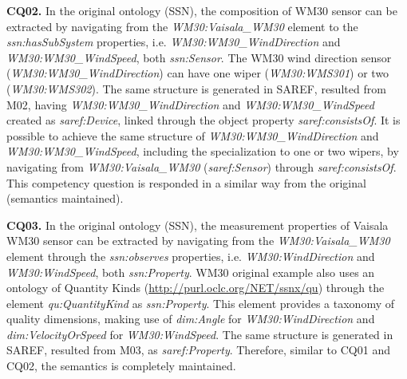 \documentclass{sig-alternate-05-2015}
\begin{document}
\noindent
\textbf{CQ02.} In the original ontology (SSN), the composition of WM30 sensor can be extracted by navigating from the \textit{WM30:\-Vaisala\-\_WM30} element to the \textit{ssn:\-hasSubSystem} properties, i.e. \textit{WM30:\-WM30\-\_Wind\-Direction} and \textit{WM30:\-WM30\-\_WindSpeed}, both \textit{ssn:\-Sensor}. The WM30 wind direction sensor (\textit{WM30:\-WM30\-\_Wind\-Direction}) can have one wiper (\textit{WM30:\-WMS301}) or two (\textit{WM30:\-WMS302}). The same structure is generated in SAREF, resulted from M02, having \textit{WM30:\-WM30\-\_Wind\-Direction} and \textit{WM30:\-WM30\-\_WindSpeed} created as \textit{saref:\-Device}, linked through the object property \textit{saref:\-consistsOf}. It is possible to achieve the same structure of \textit{WM30:\-WM30\-\_Wind\-Direction} and \textit{WM30:\-WM30\-\_WindSpeed}, including the specialization to one or two wipers, by navigating from \textit{WM30:\-Vaisala\-\_WM30} (\textit{saref:\-Sensor}) through \textit{saref:\-consistsOf}. This competency question is responded in a similar way from the original (semantics maintained).

\noindent
\textbf{CQ03.} In the original ontology (SSN), the measurement properties of Vaisala WM30 sensor can be extracted by navigating from the \textit{WM30:\-Vaisala\-\_WM30} element through the \textit{ssn:\-observes} properties, i.e. \textit{WM30:\-WindDirection} and \textit{WM30:\-WindSpeed}, both \textit{ssn:\-Property}. WM30 original example also uses an ontology of Quantity Kinds (\url{http://purl.oclc.org/NET/ssnx/qu}) through the element \textit{qu:QuantityKind} as \textit{ssn:\-Property}. This element provides a taxonomy of quality dimensions, making use of \textit{dim:Angle} for \textit{WM30:\-WindDirection} and \textit{dim:VelocityOrSpeed} for \textit{WM30:\-WindSpeed}. The same structure is generated in SAREF, resulted from M03, as \textit{saref:\-Property}. Therefore, similar to CQ01 and CQ02, the semantics is completely maintained.
\end{document}
